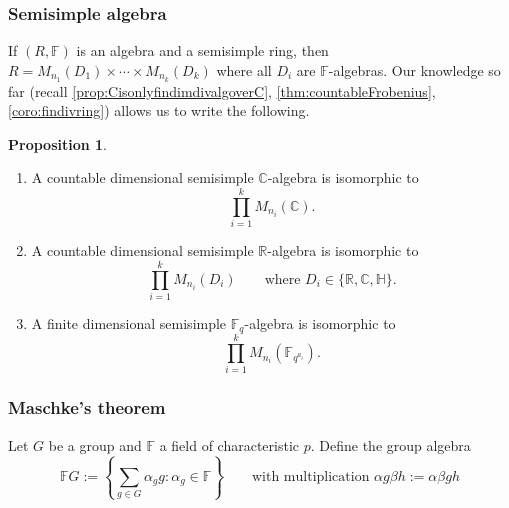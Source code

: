 \documentclass[a4paper]{article}
\newcommand{\F}{\mathbb{F}}
\newcommand{\R}{\mathbb{R}}
\newcommand{\C}{\mathbb{C}}
\newcommand{\Hq}{\mathbb{H}}
\theoremstyle{definition}
\newtheorem{prop}[defn]{Proposition}
\begin{document}
\subsubsection{Semisimple algebra}
If $(R,\F)$ is an algebra and a semisimple ring, then $R=M_{n_1}(D_1)\times\cdots\times M_{n_k}(D_k)$ where all $D_i$ are $\F$-algebras. Our knowledge so far (recall \ref{prop:CisonlyfindimdivalgoverC}, \ref{thm:countableFrobenius}, \ref{coro:findivring}) allows us to write the following.
\begin{prop}
\label{prop:coroAWforRCandFq}
\begin{enumerate}
\item A countable dimensional semisimple $\C$-algebra is isomorphic to
\[
\prod_{i=1}^k M_{n_i}(\C).
\]
\item A countable dimensional semisimple $\R$-algebra is isomorphic to
\[
\prod_{i=1}^k M_{n_i}(D_i) \qquad \text{where } D_i\in\{\R,\C,\Hq\}.
\]
\item A finite dimensional semisimple $\F_q$-algebra is isomorphic to
\[
\prod_{i=1}^k M_{n_i} \left(\F_{q^{a_i}}\right).
\]
\end{enumerate}
\end{prop}

\subsubsection{Maschke's theorem}
Let $G$ be a group and $\F$ a field of characteristic $p$. Define the group algebra
\[
\F G:=\left\{\sum_{g\in G}\alpha_g g:\alpha_g\in\F\right\} \qquad\text{with multiplication }\alpha g\beta h:=\alpha\beta gh
\]
\end{document}
